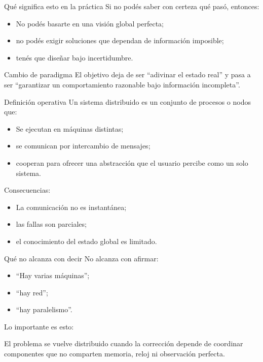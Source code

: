 \documentclass[institutional,screen,none]{ua-engineering-v6-beamer}
\begin{document}
\begin{frame}{Qué significa esto en la práctica}
Si no podés saber con certeza qué pasó, entonces:

\begin{itemize}
\item No podés basarte en una visión global perfecta;
\item no podés exigir soluciones que dependan de información imposible;
\item tenés que diseñar bajo incertidumbre.
\end{itemize}

\pause

\begin{alertblock}{Cambio de paradigma}
El objetivo deja de ser “adivinar el estado real” y pasa a ser “garantizar un comportamiento razonable bajo información incompleta”.
\end{alertblock}
\end{frame}


\begin{frame}{Definición operativa}
Un sistema distribuido es un conjunto de procesos o nodos que:

\begin{itemize}
\item Se ejecutan en máquinas distintas;
\item se comunican por intercambio de mensajes;
\item cooperan para ofrecer una abstracción que el usuario percibe como un solo sistema.
\end{itemize}

\pause

Consecuencias:
\begin{itemize}
\item La comunicación no es instantánea;
\item las fallas son parciales;
\item el conocimiento del estado global es limitado.
\end{itemize}
\end{frame}

\begin{frame}{Qué no alcanza con decir}
No alcanza con afirmar:
\begin{itemize}
\item “Hay varias máquinas”;
\item “hay red”;
\item “hay paralelismo”.
\end{itemize}

\pause

Lo importante es esto:

\begin{block}{}
El problema se vuelve distribuido cuando la corrección depende de coordinar componentes que no comparten memoria, reloj ni observación perfecta.
\end{block}
\end{frame}
\end{document}
